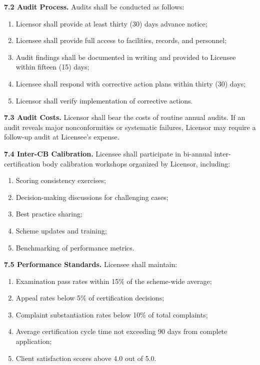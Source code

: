 \documentclass[11pt,a4paper]{article}
\begin{document}
\textbf{7.2 Audit Process.} Audits shall be conducted as follows:

\begin{enumerate}[label=\alph*)]
\item Licensor shall provide at least thirty (30) days advance notice;
\item Licensee shall provide full access to facilities, records, and personnel;
\item Audit findings shall be documented in writing and provided to Licensee within fifteen (15) days;
\item Licensee shall respond with corrective action plans within thirty (30) days;
\item Licensor shall verify implementation of corrective actions.
\end{enumerate}

\textbf{7.3 Audit Costs.} Licensor shall bear the costs of routine annual audits. If an audit reveals major nonconformities or systematic failures, Licensor may require a follow-up audit at Licensee's expense.

\textbf{7.4 Inter-CB Calibration.} Licensee shall participate in bi-annual inter-certification body calibration workshops organized by Licensor, including:

\begin{enumerate}[label=\alph*)]
\item Scoring consistency exercises;
\item Decision-making discussions for challenging cases;
\item Best practice sharing;
\item Scheme updates and training;
\item Benchmarking of performance metrics.
\end{enumerate}

\textbf{7.5 Performance Standards.} Licensee shall maintain:

\begin{enumerate}[label=\alph*)]
\item Examination pass rates within 15\% of the scheme-wide average;
\item Appeal rates below 5\% of certification decisions;
\item Complaint substantiation rates below 10\% of total complaints;
\item Average certification cycle time not exceeding 90 days from complete application;
\item Client satisfaction scores above 4.0 out of 5.0.
\end{enumerate}
\end{document}
